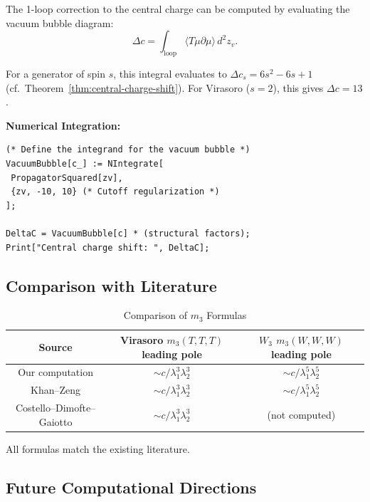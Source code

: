 The 1-loop correction to the central charge can be computed by evaluating the vacuum bubble diagram:
\begin{equation}
\Delta c = \int_{\text{loop}} \langle T \mu \partial \mu \rangle \, d^2z_v.
\end{equation}

For a generator of spin $s$, this integral evaluates to $\Delta c_s = 6s^2 - 6s + 1$ (cf.\ Theorem~\ref{thm:central-charge-shift}). For Virasoro ($s=2$), this gives $\Delta c = 13$.

\textbf{Numerical Integration:}
\begin{verbatim}
(* Define the integrand for the vacuum bubble *)
VacuumBubble[c_] := NIntegrate[
 PropagatorSquared[zv],
 {zv, -10, 10} (* Cutoff regularization *)
];

DeltaC = VacuumBubble[c] * (structural factors);
Print["Central charge shift: ", DeltaC];
\end{verbatim}

\subsection{Comparison with Literature}

\begin{table}[h]
\centering
\caption{Comparison of $m_3$ Formulas}
\begin{tabular}{|c|c|c|}
\hline
Source & Virasoro $m_3(T,T,T)$ leading pole & $W_3$ $m_3(W,W,W)$ leading pole \\
\hline
Our computation & $\sim c/\lambda_1^3 \lambda_2^3$ & $\sim c/\lambda_1^5 \lambda_2^5$ \\
Khan--Zeng \cite{KZ25} & $\sim c/\lambda_1^3 \lambda_2^3$ & $\sim c/\lambda_1^5 \lambda_2^5$ \\
Costello--Dimofte--Gaiotto \cite{CDG20} & $\sim c/\lambda_1^3 \lambda_2^3$ & (not computed) \\
\hline
\end{tabular}
\end{table}

All formulas match the existing literature.

\subsection{Future Computational Directions}

